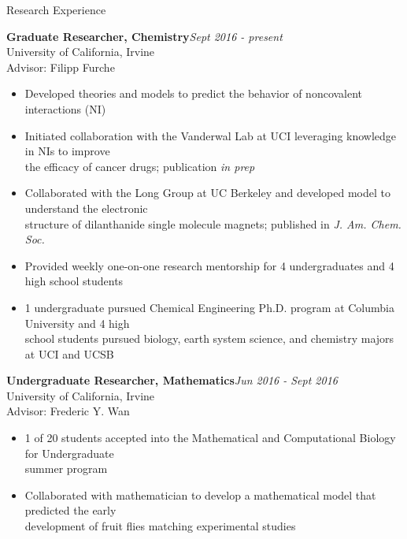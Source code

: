 \documentclass{resume} %
\begin{document}
\begin{rSection}{Research Experience}

\textbf{Graduate Researcher, Chemistry}\hfill {\em Sept 2016 - present}\\
University of California, Irvine\\
Advisor: Filipp Furche
\vspace{-0.5em}
\begin{itemize}    
\itemsep-0.65em
\item Developed theories and models to predict the behavior of noncovalent interactions (NI)
\item Initiated collaboration with the Vanderwal Lab at UCI leveraging knowledge in NIs to improve\\
  the efficacy of cancer drugs; publication \textit{in prep}
\item Collaborated with the Long Group at UC Berkeley and developed model to understand the electronic \\
  structure of dilanthanide single molecule magnets; published in \textit{J. Am. Chem. Soc.}
\item Provided weekly one-on-one research mentorship for 4 undergraduates %
  and 4 high school students %
\item 1 undergraduate pursued Chemical Engineering Ph.D. program at Columbia University and
  4 high \\
  school students pursued biology, earth system science, and chemistry majors at UCI
  and UCSB
\end{itemize}

\textbf{Undergraduate Researcher, Mathematics}\hfill {\em Jun 2016 - Sept 2016}\\
University of California, Irvine \\
Advisor: Frederic Y. Wan
\vspace{-0.5em}
\begin{itemize}
\itemsep-0.65em
\item 1 of 20 students accepted into the Mathematical and Computational Biology for Undergraduate \\
  summer program
\item Collaborated with mathematician to develop a mathematical model that predicted the early \\
  development of fruit flies matching experimental studies
\end{itemize}
  

\end{rSection}
\end{document}
